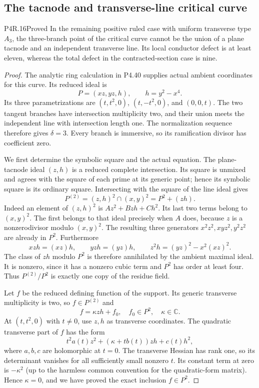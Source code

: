 \subsection{The tacnode and transverse-line critical curve}

\begin{statement}{P4R.16}{Proved}
In the remaining positive ruled case with uniform transverse
type $A_3$, the three-branch point of the critical curve cannot
be the union of a plane tacnode and an independent transverse
line. Its local conductor defect is at least eleven, whereas
the total defect in the contracted-section case is nine.
\end{statement}
\begin{proof}
The analytic ring calculation in P4.40 supplies actual ambient
coordinates for this curve. Its reduced ideal is
\[
 P=(xz,yz,h),\qquad h=y^2-x^4.
\]
Its three parametrizations are $(t,t^2,0)$, $(t,-t^2,0)$,
and $(0,0,t)$. The two tangent branches have intersection
multiplicity two, and their union meets the independent line
with intersection length one. The normalization sequence
therefore gives $\delta=3$. Every branch is immersive, so
its ramification divisor has coefficient zero.

We first determine the symbolic square and the actual
equation. The plane-tacnode ideal $(z,h)$ is a reduced
complete intersection. Its square is unmixed and agrees
with the square of each prime at its generic point; hence
its symbolic square is its ordinary square. Intersecting
with the square of the line ideal gives
\[
 P^{(2)}=(z,h)^2\cap(x,y)^2=P^2+(zh).
\]
Indeed an element of $(z,h)^2$ is $Az^2+Bzh+Ch^2$.
Its last two terms belong to $(x,y)^2$. The first belongs
to that ideal precisely when $A$ does, because $z$ is a
nonzerodivisor modulo $(x,y)^2$. The resulting three
generators $x^2z^2,xyz^2,y^2z^2$ are already in $P^2$.
Furthermore
\[
 xzh=(xz)h,\qquad yzh=(yz)h,\qquad
 z^2h=(yz)^2-x^2(xz)^2.
\]
The class of $zh$ modulo $P^2$ is therefore annihilated
by the ambient maximal ideal. It is nonzero, since it has
a nonzero cubic term and $P^2$ has order at least four.
Thus $P^{(2)}/P^2$ is exactly one copy of the residue field.

Let $f$ be the reduced defining function of the support.
Its generic transverse multiplicity is two, so
$f\in P^{(2)}$ and
\[
                       f=\kappa zh+f_0,\quad f_0\in P^2,
                       \quad\kappa\in\mathbb C.
\]
At $(t,t^2,0)$ with $t\ne0$, use $z,h$ as transverse
coordinates. The quadratic transverse part of $f$ has the
form
\[
 t^2a(t)z^2+(\kappa+t b(t))zh+c(t)h^2,
\]
where $a,b,c$ are holomorphic at $t=0$. The transverse
Hessian has rank one, so its determinant vanishes for
all sufficiently small nonzero $t$. Its constant term at
zero is $-\kappa^2$ (up to the harmless common convention
for the quadratic-form matrix). Hence $\kappa=0$, and
we have proved the exact inclusion $f\in P^2$.


\end{proof}
